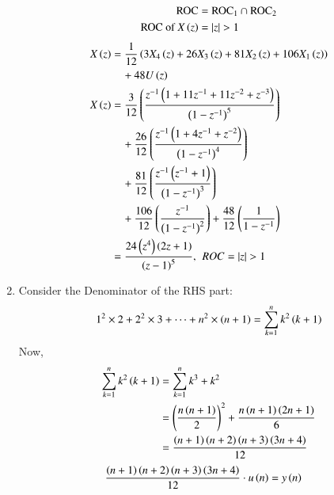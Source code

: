 \documentclass[journal,12pt,twocolumn]{IEEEtran}
\theoremstyle{remark}
\begin{document}
\begin{enumerate}[label=\arabic*.]
\begin{align}
    \text{ROC} &= \text{ROC}_1 \cap \text{ROC}_2 \label{eq:roc_intersection} \\
    \text{ROC of $X\brak{z}$}  &= |z|>1 
\end{align}
\vspace{-\baselineskip}
\begin{align}
X\brak{z} &= \frac{1}{12}\brak{3X_4\brak{z} + 26X_3\brak{z} + 81X_2\brak{z} + 106X_1\brak{z}} \label{eq:11.9.5.26.4} \notag \\
&\quad + 48U \brak{z} \\
X\brak{z}&= \frac{3}{12}\left(\frac{z^{-1}\brak{1+11z^{-1}+11z^{-2}+z^{-3}}}{\brak{1-z^{-1}}^5}\right)  \\
&\quad + \frac{26}{12}\left(\frac{z^{-1}\brak{1+4z^{-1}+z^{-2}}}{\brak{1-z^{-1}}^4}\right)\notag \\
&\quad + \frac{81}{12}\left(\frac{z^{-1}\brak{z^{-1}+1}}{\brak{1-z^{-1}}^3}\right) \notag \\
&\quad + \frac{106}{12}\left(\frac{z^{-1}}{\brak{1-z^{-1}}^2}\right) + \frac{48}{12}\left(\frac{1}{1 - z^{-1}} \right) \notag \\
&= \frac{24 \brak{z^4} \brak{2z+1}}{\brak{z-1}^5} ,\hspace{4pt} ROC=|z|>1
\end{align}
\item Consider the Denominator of the RHS part:
\begin{equation}
    1^2\times2 + 2^2\times3 +\dots + n^2\times\left(n+1\right) = \sum_{k=1}^n k^2\left(k+1\right)
\end{equation}
Now,
\begin{align}
     \sum_{k=1}^n k^2\left(k+1\right) &= \sum_{k=1}^n k^3+k^2\\
                           &=  \left(\frac{n\left(n+1\right)}{2}\right)^{\scriptstyle 2}+\frac{n\left(n+1\right)\left(2n+1\right)}{6}\\
                           &= \frac{\left(n+1\right)\left(n+2\right)\left(n+3\right)\left(3n+4\right)}{12}
\end{align}
\begin{align}
    \frac{\left(n+1\right)\left(n+2\right)\left(n+3\right)\left(3n+4\right)}{12}\cdot u\left(n\right) &= y\left(n\right)
\end{align}
\begin{figure}[h]
    \hspace{1cm}

\end{figure}
\end{enumerate}
\end{document}

